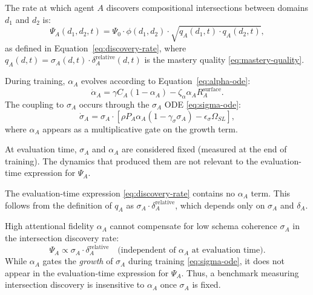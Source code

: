
\begin{definition}
The rate at which agent $A$ discovers compositional intersections
between domains $d_1$ and $d_2$ is:
\[
\Psi_A(d_1, d_2, t) = \Psi_0 \cdot \phi(d_1, d_2) \cdot
\sqrt{q_A(d_1, t) \cdot q_A(d_2, t)},
\]
as defined in Equation~\eqref{eq:discovery-rate}, where
$q_A(d, t) = \sigma_A(d, t) \cdot \delta_A^{\text{relative}}(d, t)$
is the mastery quality \eqref{eq:mastery-quality}.
\end{definition}

\begin{definition}
During training, $\alpha_A$ evolves according to
Equation~\eqref{eq:alpha-ode}:
\[
\dot{\alpha}_A = \gamma C_A (1 - \alpha_A) - \zeta_\alpha \alpha_A R_A^{\text{surface}}.
\]
The coupling to $\sigma_A$ occurs through the $\sigma_A$ ODE
\eqref{eq:sigma-ode}:
\[
\dot{\sigma}_A = \sigma_A \cdot
[\rho P_A \alpha_A (1 - \gamma_\sigma \sigma_A) - \epsilon_\sigma \Omega_{SL}],
\]
where $\alpha_A$ appears as a multiplicative gate on the growth term.
\end{definition}

\begin{assumption}
At evaluation time, $\sigma_A$ and $\alpha_A$ are considered fixed
(measured at the end of training). The dynamics that produced them
are not relevant to the evaluation-time expression for $\Psi_A$.
\end{assumption}

\begin{assumption}
The evaluation-time expression \eqref{eq:discovery-rate} contains
no $\alpha_A$ term. This follows from the definition of $q_A$ as
$\sigma_A \cdot \delta_A^{\text{relative}}$, which depends only on
$\sigma_A$ and $\delta_A$.
\end{assumption}

\begin{proposition}
\label{prop:compensation}
High attentional fidelity $\alpha_A$ cannot compensate for low schema
coherence $\sigma_A$ in the intersection discovery rate:
\[
\Psi_A \propto \sigma_A \cdot \delta_A^{\text{relative}}
\quad \text{(independent of } \alpha_A \text{ at evaluation time)}.
\]
While $\alpha_A$ gates the \emph{growth} of $\sigma_A$ during training
\eqref{eq:sigma-ode}, it does not appear in the evaluation-time
expression for $\Psi_A$. Thus, a benchmark measuring intersection
discovery is insensitive to $\alpha_A$ once $\sigma_A$ is fixed.
\end{proposition}

